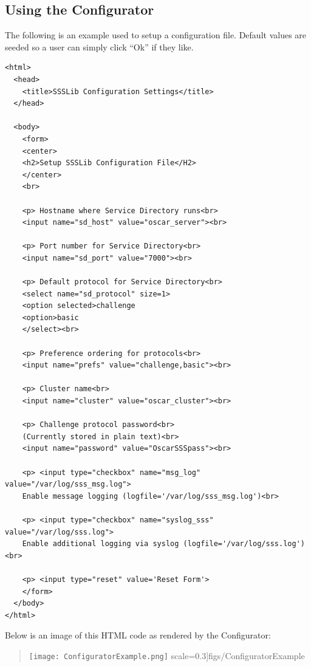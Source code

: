 \subsection{Using the Configurator}
\label{sect:example-configurator}

The following is an example  used to setup a
configuration file.  Default values are seeded so a user can simply click
``Ok'' if they like.

\begin{scriptsize}
\begin{verbatim}
<html>
  <head> 
    <title>SSSLib Configuration Settings</title> 
  </head> 

  <body>
    <form>
    <center>
    <h2>Setup SSSLib Configuration File</H2>
    </center>
    <br>

    <p> Hostname where Service Directory runs<br>
    <input name="sd_host" value="oscar_server"><br>

    <p> Port number for Service Directory<br>
    <input name="sd_port" value="7000"><br>

    <p> Default protocol for Service Directory<br>
    <select name="sd_protocol" size=1>
    <option selected>challenge
    <option>basic
    </select><br>

    <p> Preference ordering for protocols<br>
    <input name="prefs" value="challenge,basic"><br>

    <p> Cluster name<br>
    <input name="cluster" value="oscar_cluster"><br>

    <p> Challenge protocol password<br>
    (Currently stored in plain text)<br>
    <input name="password" value="OscarSSSpass"><br>   

    <p> <input type="checkbox" name="msg_log" value="/var/log/sss_msg.log">
    Enable message logging (logfile='/var/log/sss_msg.log')<br>

    <p> <input type="checkbox" name="syslog_sss" value="/var/log/sss.log">   
    Enable additional logging via syslog (logfile='/var/log/sss.log')<br>

    <p> <input type="reset" value='Reset Form'>
    </form>
  </body> 
</html>
\end{verbatim}
\end{scriptsize}

Below is an image of this HTML code as rendered by the Configurator:

\begin{quote}
\texttt{[image: ConfiguratorExample.png]}
  scale=0.3]{figs/ConfiguratorExample}
\end{quote}



